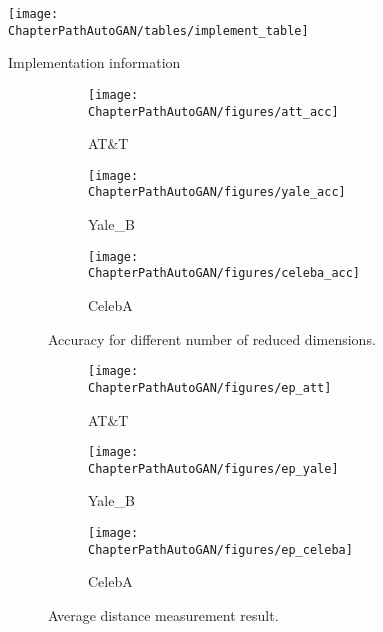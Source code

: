 


\begin{table*}
	\centering
	\texttt{[image: \\ChapterPathAutoGAN/tables/implement\_table]}
	\caption{Implementation information}
	\label{table:implementation}
\end{table*}



\begin{figure*}[ht!]
	\begin{subfigure}{.32\textwidth}
		\texttt{[image: \\ChapterPathAutoGAN/figures/att\_acc]}
		\captionsetup{justification=centering}
		\caption{ AT\&T}
		\label{fig:att_acc}
	\end{subfigure}
	\begin{subfigure}{.32\textwidth}
		\texttt{[image: \\ChapterPathAutoGAN/figures/yale\_acc]}
		\captionsetup{justification=centering}
		\caption{Yale\_B}
		\label{fig:yale_acc}
	\end{subfigure}
	\begin{subfigure}{.32\textwidth}
		\texttt{[image: \\ChapterPathAutoGAN/figures/celeba\_acc]}
		\captionsetup{justification=centering}
		\caption{CelebA}
		\label{fig:celeba_acc}
	\end{subfigure}
	\caption{Accuracy for different number of reduced dimensions. }
	\label{fig:acc}
\end{figure*}

\begin{figure*}[ht!]
	\begin{subfigure}{.32\textwidth}
		\texttt{[image: \\ChapterPathAutoGAN/figures/ep\_att]}
		\captionsetup{justification=centering}
		\caption{ AT\&T}
		\label{fig:att_dist}
	\end{subfigure}
	\begin{subfigure}{.32\textwidth}
		\texttt{[image: \\ChapterPathAutoGAN/figures/ep\_yale]}
		\captionsetup{justification=centering}
		\caption{Yale\_B}
		\label{fig:yale_dist}
	\end{subfigure}
	\begin{subfigure}{.32\textwidth}
		\texttt{[image: \\ChapterPathAutoGAN/figures/ep\_celeba]}
		\captionsetup{justification=centering}
		\caption{CelebA}
		\label{fig:celeba_dist}
	\end{subfigure}
	\caption{Average distance measurement result.}
	\label{fig:distresult}
\end{figure*}


